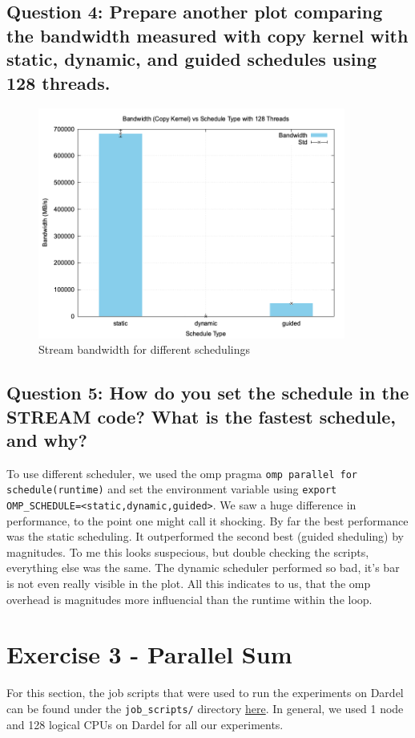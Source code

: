 \documentclass[a4paper,10pt]{article}
\begin{document}
\subsection{Question 4: Prepare another plot comparing the bandwidth measured with copy kernel with static, dynamic, and guided schedules using 128 threads.}
\begin{figure}[H]
  \centering
  \includegraphics[width=0.9\textwidth]{img/ex2/ex2_schedule.png}
  \caption{Stream bandwidth for different schedulings}
  \label{fig:ex2-schedule}
\end{figure}
\subsection{Question 5: How do you set the schedule in the STREAM code? What is the fastest schedule, and why?}
To use different scheduler, we used the omp pragma \verb|omp parallel for schedule(runtime)| and set the environment variable using \verb|export OMP_SCHEDULE=<static,dynamic,guided>|.
We saw a huge difference in performance, to the point one might call it shocking.
By far the best performance was the static scheduling.
It outperformed the second best (guided sheduling) by magnitudes.
To me this looks suspecious, but double checking the scripts, everything else was the same.
The dynamic scheduler performed so bad, it's bar is not even really visible in the plot.
All this indicates to us, that the omp overhead is magnitudes more influencial than the runtime within the loop.

\section{Exercise 3 - Parallel Sum}
For this section, the job scripts that were used to run the experiments on Dardel can be found under the \verb|job_scripts/| directory \href{https://github.com/paulmyr/DD2356-MethodsHPC/tree/master/3_open_mp/exercise3/job_scripts}{here}. In general, we used 1 node and 128 logical CPUs on Dardel for all our experiments. 
\end{document}
